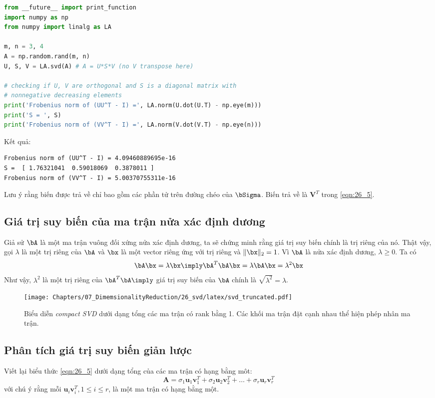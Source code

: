 \begin{lstlisting}[language=Python]
from __future__ import print_function 
import numpy as np 
from numpy import linalg as LA 
 
m, n = 3, 4 
A = np.random.rand(m, n) 
U, S, V = LA.svd(A) # A = U*S*V (no V transpose here)

# checking if U, V are orthogonal and S is a diagonal matrix with 
# nonnegative decreasing elements 
print('Frobenius norm of (UU^T - I) =', LA.norm(U.dot(U.T) - np.eye(m))) 
print('S = ', S) 
print('Frobenius norm of (VV^T - I) =', LA.norm(V.dot(V.T) - np.eye(n)))
\end{lstlisting}
\newpage 
Kết quả:
\begin{lstlisting}
Frobenius norm of (UU^T - I) = 4.09460889695e-16
S =  [ 1.76321041  0.59018069  0.3878011 ]
Frobenius norm of (VV^T - I) = 5.00370755311e-16
\end{lstlisting}
 
Lưu ý rằng biến  được trả về chỉ bao gồm các phần tử trên đường
chéo của $\bSigma$. Biến  trả về là $\mathbf{V}^T$ trong
\eqref{eqn:26_5}. 
 
\subsection{Giá trị suy biến của ma trận nửa xác định dương}
Giả sử $\bA$ là một ma trận vuông đối xứng nửa xác định dương, ta sẽ chứng minh rằng giá trị suy biến  chính là trị riêng của nó. Thật vậy, gọi $\lambda$ là một trị riêng của $\bA$ và $\bx$ là một vector riêng ứng với trị riêng và $\|\bx\|_2 = 1$. Vì $\bA$ là nửa xác định dương, $\lambda \geq 0$. 
Ta có 
\begin{equation}
    \bA\bx = \lambda\bx \imply \bA^T\bA\bx = \lambda\bA\bx = \lambda^2\bx 
\end{equation}
Như vậy, $\lambda^2$ là một trị riêng của $\bA^T\bA \imply$ giá trị suy biến của $\bA$ chính là $\sqrt{\lambda^2} = \lambda$. 

\begin{figure}[t]
\centering
    \texttt{[image: Chapters/07\_DimemsionalityReduction/26\_svd/latex/svd\_truncated.pdf]}
    \caption[]{Biểu diễn \textit{compact SVD} dưới dạng tổng
    các ma trận có rank bằng 1. Các khối ma trận đặt cạnh nhau thể hiện phép
    nhân ma trận.}
    \label{fig:26_2}
\end{figure}
 

\subsection{Phân tích giá trị suy biến giản lược}
Viết lại biểu thức \eqref{eqn:26_5} dưới dạng tổng của các ma trận có hạng
bằng môt:
\begin{equation} 
\mathbf{A} = \sigma_1 \mathbf{u}_1 \mathbf{v}^T_1 + \sigma_2\mathbf{u}_2\mathbf{v}_2^T + \dots + \sigma_r\mathbf{u}_r\mathbf{v}_r^T 
\end{equation} 
với chú ý rằng mỗi $\mathbf{u}_i\mathbf{v}^T_i, 1 \leq i \leq r$, là một ma trận có hạng bằng một.  
 
